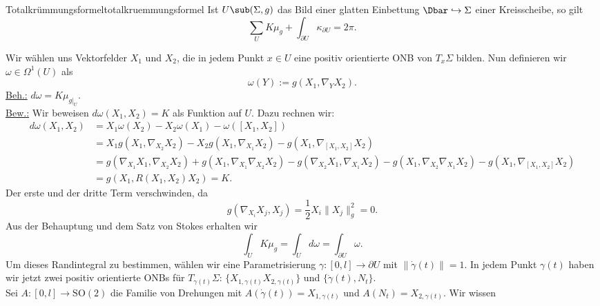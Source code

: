 \begin{theorem}{Totalkrümmungsformel}{totalkruemmungsformel}
Ist $U\sub (\Sigma, g)$ das Bild einer glatten Einbettung $\Dbar \hookrightarrow \Sigma$ einer Kreisscheibe, so gilt
\begin{equation}
\sum_U K \mu_g + \int_{\partial U} \kappa_{\partial U} = 2 \pi.
\end{equation}
\end{theorem}
\begin{beweis}
Wir wählen uns Vektorfelder $X_1$ und $X_2$, die in jedem Punkt $x \in U$ eine positiv orientierte ONB von $T_x \Sigma$ bilden. Nun definieren wir $\omega \in \Omega^1(U)$ als
\begin{equation}
\omega(Y):= g(X_1, \nabla_YX_2).
\end{equation}
\underline{Beh.:} \quad $d\omega = K \mu_{g|_U}$.\\
\underline{Bew.:} \quad Wir beweisen $d\omega(X_1, X_2) = K$ als Funktion auf $U$. Dazu rechnen wir:
\begin{align}
d\omega (X_1, X_2) &= X_1 \omega (X_2) - X_2 \omega (X_1) - \omega( [X_1, X_2])\\
&= X_1 g(X_1, \nabla_{X_2} X_2) - X_2 g(X_1, \nabla_{X_1}X_2) - g(X_1, \nabla_{[X_1, X_2]} X_2)\\
&= g(\nabla_{X_1} X_1, \nabla_{X_2} X_2) + g(X_1, \nabla_{X_1}\nabla_{X_2} X_2) - g(\nabla_{X_2}X_1, \nabla_{X_1}X_2)-g(X_1, \nabla_{X_2}\nabla_{X_1}X_2) - g(X_1, \nabla_{[X_1, X_2]} X_2)\\
&= g(X_1, R(X_1, X_2)X_2) = K.
\end{align}
Der erste und der dritte Term verschwinden, da 
\begin{equation}
g(\nabla_{X_i}X_j, X_j) = \frac{1}{2} X_i \| X_j \|^2_g = 0.
\end{equation}
Aus der Behauptung und dem Satz von Stokes erhalten wir 
\begin{equation}
\int_U K \mu_g = \int_U d\omega = \int_{\partial U} \omega.
\end{equation}
Um dieses Randintegral zu bestimmen, wählen wir eine Parametrisierung $\gamma: [0,l] \to \partial U$ mit $\| \dot{\gamma}(t) \| =1$. In jedem Punkt $\gamma (t)$ haben wir jetzt zwei positiv orientierte ONBs für $T_{\gamma(t)}\Sigma$: $\{ X_{1, \gamma(t)} X_{2, \gamma(t)} \}$ und $\{ \dot{\gamma} (t), N_t \}$.\\
Sei $A: [0,l] \to \text{SO}(2)$ die Familie von Drehungen mit $A(\dot{\gamma}(t)) = X_{1, \gamma(t)}$ und $A(N_t) = X_{2, \gamma(t)}$. Wir wissen
\begin{equation}

\end{equation}
\end{beweis}
